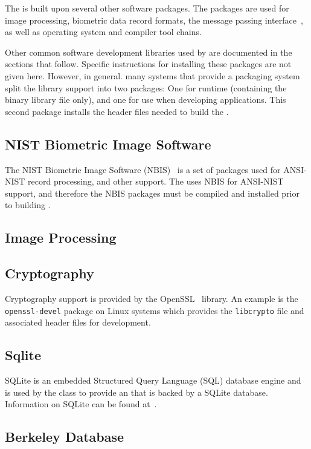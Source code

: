 The \lname is built upon several other software packages. The packages are
used for image processing, biometric data record formats, the message
passing interface~\cite{mpi}, as well as operating system and compiler
tool chains.

Other common software development libraries used by \sname are documented in
the sections that follow. Specific instructions for installing these packages
are not given here. However, in general. many systems that provide a packaging
system split the library support into two packages: One for runtime (containing
the binary library file only), and one for use when developing applications.
This second package installs the header files needed to build the \sname.

\subsection{NIST Biometric Image Software}

The NIST Biometric Image Software (NBIS)~\cite{nist:nbis} is a set of packages
used for ANSI-NIST record processing, and other support. The \lname uses NBIS
for ANSI-NIST support, and therefore the NBIS packages must be compiled and
installed prior to building \sname.

\subsection{Image Processing}

\subsection{Cryptography}

Cryptography support is provided by the OpenSSL~\cite{openssl} library.
An example is the \texttt{openssl-devel} package on Linux systems which
provides the \texttt{libcrypto} file and associated header files for
development.

\subsection{Sqlite}

SQLite is an embedded Structured Query Language (SQL) database engine and is
used by the  class to provide an
 that is backed by a SQLite database. Information
on SQLite can be found at~\cite{sqlite}.

\subsection{Berkeley Database}

